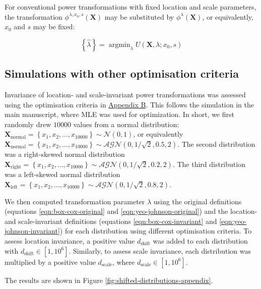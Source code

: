 \documentclass[
  a4paper,
]{article}
\DeclareMathOperator*{\argmin}{argmin}
\begin{document}
For conventional power transformations with fixed location and scale
parameters, the transformation \(\phi^{\lambda, x_0, s} (\mathbf{X})\)
may be substituted by \(\phi^{\lambda} (\mathbf{X})\), or equivalently,
\(x_0\) and \(s\) may be fixed:

\begin{equation}
\left\{ \hat{\lambda}\right\} = \argmin_{\lambda} U\left(\mathbf{X}, \lambda; x_0, s \right)
\end{equation}

\subsection{Simulations with other optimisation
criteria}\label{simulations-with-other-optimisation-criteria}

Invariance of location- and scale-invariant power transformations was
assessed using the optimisation criteria in
\href{Appendix\%20B:\%20Optimisation\%20of\%20transformation\%20parameters}{Appendix
B}. This follows the simulation in the main manuscript, where MLE was
used for optimization. In short, we first randomly drew \(10000\) values
from a normal distribution:
\(\mathbf{X}_{\text{normal}} = \left\{x_1, x_2, \ldots, x_{10000} \right\} \sim \mathcal{N}\left(0, 1\right)\),
or equivalently
\(\mathbf{X}_{\text{normal}} = \left\{x_1, x_2, \ldots, x_{10000} \right\} \sim \mathcal{AGN}\left(0, 1/\sqrt{2}, 0.5, 2\right)\).
The second distribution was a right-skewed normal distribution
\(\mathbf{X}_{\text{right}} = \left\{x_1, x_2, \ldots, x_{10000} \right\} \sim \mathcal{AGN}\left(0, 1/\sqrt{2}, 0.2, 2\right)\).
The third distribution was a left-skewed normal distribution
\(\mathbf{X}_{\text{left}} = \left\{x_1, x_2, \ldots, x_{10000} \right\} \sim \mathcal{AGN}\left(0, 1/\sqrt{2}, 0.8, 2\right)\).

We then computed transformation parameter \(\lambda\) using the original
definitions (equations \ref{eqn:box-cox-original} and
\ref{eqn:yeo-johnson-original}) and the location- and scale-invariant
definitions (equations \ref{eqn:box-cox-invariant} and
\ref{eqn:yeo-johnson-invariant}) for each distribution using different
optimisation criteria. To assess location invariance, a positive value
\(d_{\text{shift}}\) was added to each distribution with
\(d_{\text{shift}} \in [1, 10^6]\). Similarly, to assess scale
invariance, each distribution was multiplied by a positive value
\(d_{\text{scale}}\), where \(d_{\text{scale}} \in [1, 10^6]\).

The results are shown in Figure
\ref{fig:shifted-distributions-appendix}.
\end{document}
